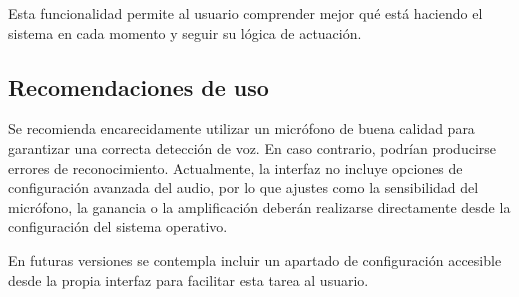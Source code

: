 Esta funcionalidad permite al usuario comprender mejor qué está haciendo el sistema en cada momento y seguir su lógica de actuación.

\subsection{Recomendaciones de uso}

Se recomienda encarecidamente utilizar un micrófono de buena calidad para garantizar una correcta detección de voz. En caso contrario, podrían producirse errores de reconocimiento. Actualmente, la interfaz no incluye opciones de configuración avanzada del audio, por lo que ajustes como la sensibilidad del micrófono, la ganancia o la amplificación deberán realizarse directamente desde la configuración del sistema operativo.

En futuras versiones se contempla incluir un apartado de configuración accesible desde la propia interfaz para facilitar esta tarea al usuario.
